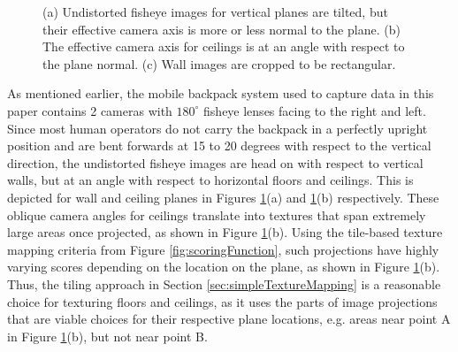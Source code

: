 \message{ !name(oldpaper.tex)}\documentclass[10pt,twocolumn,letterpaper]{article}
\begin{document}
\begin{figure}
  \centering
  \centering
  \centering
  \caption{(a) Undistorted fisheye images for vertical planes are
    tilted, but their effective camera axis is more or less normal to
    the plane. (b) The effective camera axis for ceilings is at an
    angle with respect to the plane normal. (c) Wall images are
    cropped to be rectangular.}
  \label{fig:projectionAngles}
\end{figure}



As mentioned earlier, the mobile backpack system used to capture data
in this paper contains 2 cameras with $180^\circ$ fisheye lenses
facing to the right and left. Since most human operators do not carry
the backpack in a perfectly upright position and are bent forwards at
15 to 20 degrees with respect to the vertical direction, the
undistorted fisheye images are head on with respect to vertical walls,
but at an angle with respect to horizontal floors and ceilings. This
is depicted for wall and ceiling planes in Figures
\ref{fig:projectionAngles}(a) and \ref{fig:projectionAngles}(b)
respectively. These oblique camera angles for ceilings translate into
textures that span extremely large areas once projected, as shown in
Figure \ref{fig:projectionAngles}(b). Using the tile-based texture
mapping criteria from Figure \ref{fig:scoringFunction}, such
projections have highly varying scores depending on the location on
the plane, as shown in Figure \ref{fig:projectionAngles}(b). Thus, the
tiling approach in Section \ref{sec:simpleTextureMapping} is a
reasonable choice for texturing floors and ceilings, as it uses the
parts of image projections that are viable choices for their
respective plane locations, e.g. areas near point A in Figure
\ref{fig:projectionAngles}(b), but not near point B.
\end{document}
